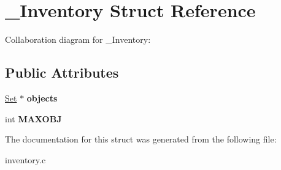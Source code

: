 \hypertarget{struct__Inventory}{}\section{\+\_\+\+Inventory Struct Reference}
\label{struct__Inventory}


Collaboration diagram for \+\_\+\+Inventory\+:
\subsection*{Public Attributes}
\begin{DoxyCompactItemize}
\item 
\mbox{\label{struct__Inventory_a478e4b50a62b9e7d5b17e335319faa97}} 
\hyperlink{struct__Set}{Set} $\ast$ {\bfseries objects}
\item 
\mbox{\label{struct__Inventory_acf232f02d70ea9c9d2870c5d732f4b51}} 
int {\bfseries M\+A\+X\+O\+BJ}
\end{DoxyCompactItemize}


The documentation for this struct was generated from the following file\+:\begin{DoxyCompactItemize}
\item 
inventory.\+c\end{DoxyCompactItemize}
